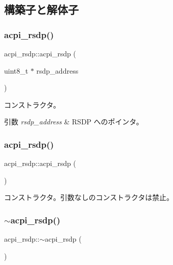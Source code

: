 \subsection{構築子と解体子}
\hypertarget{classacpi__rsdp_a1d261f44c3678f4986679e230b4b09c4}{}\label{classacpi__rsdp_a1d261f44c3678f4986679e230b4b09c4} 
\subsubsection{\texorpdfstring{acpi\+\_\+rsdp()}{acpi\_rsdp()}\hspace{0.1cm}{\footnotesize\ttfamily [1/4]}}
{\footnotesize\ttfamily acpi\+\_\+rsdp\+::acpi\+\_\+rsdp (\begin{DoxyParamCaption}\item[{uint8\+\_\+t $\ast$}]{rsdp\+\_\+address }\end{DoxyParamCaption})}

コンストラクタ。 
\begin{DoxyParams}{引数}
{\em rsdp\+\_\+address} & R\+S\+DP へのポインタ。 \\
\hline
\end{DoxyParams}
\hypertarget{classacpi__rsdp_a054a922cb58cc17206ecdb0d3d1a85d9}{}\label{classacpi__rsdp_a054a922cb58cc17206ecdb0d3d1a85d9} 
\subsubsection{\texorpdfstring{acpi\+\_\+rsdp()}{acpi\_rsdp()}\hspace{0.1cm}{\footnotesize\ttfamily [2/4]}}
{\footnotesize\ttfamily acpi\+\_\+rsdp\+::acpi\+\_\+rsdp (\begin{DoxyParamCaption}{ }\end{DoxyParamCaption})\hspace{0.3cm}{\ttfamily [delete]}}

コンストラクタ。引数なしのコンストラクタは禁止。 \hypertarget{classacpi__rsdp_a98f9d6ee90c359457ecc9193ccb33299}{}\label{classacpi__rsdp_a98f9d6ee90c359457ecc9193ccb33299} 
\subsubsection{\texorpdfstring{$\sim$acpi\+\_\+rsdp()}{~acpi\_rsdp()}}
{\footnotesize\ttfamily acpi\+\_\+rsdp\+::$\sim$acpi\+\_\+rsdp (\begin{DoxyParamCaption}{ }\end{DoxyParamCaption})\hspace{0.3cm}{\ttfamily [virtual]}}

